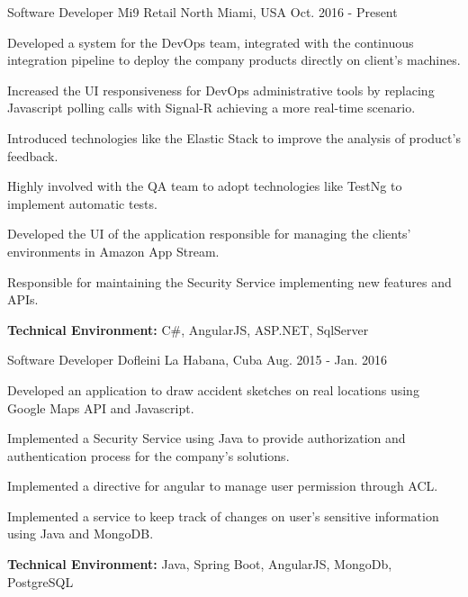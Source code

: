 
\begin{cventries}


\workexperienceentry
{Software Developer} %
{Mi9 Retail} %
{North Miami, USA} %
{Oct. 2016 - Present} %
{ %
\begin{cvitems}
    \item {Developed a system for the DevOps team, integrated with the continuous integration pipeline to deploy the company products directly on client's machines.}
    \item {Increased the UI responsiveness for DevOps administrative tools by replacing Javascript polling calls with Signal-R achieving a more real-time scenario.}
    \item {Introduced technologies like the Elastic Stack to improve the analysis of  product's feedback.}  
    \item {Highly involved with the QA team to adopt technologies like TestNg to implement automatic tests.}
    \item {Developed the UI of the application responsible for managing the clients' environments in Amazon App Stream.}
    \item {Responsible for maintaining the Security Service implementing new features and APIs.}
\end{cvitems}
}
{\textbf{Technical Environment:} C\#, AngularJS, ASP.NET, SqlServer}


\workexperienceentry
{Software Developer} %
{Dofleini} %
{La Habana, Cuba} %
{Aug. 2015 - Jan. 2016} %
{ %
\begin{cvitems}
	\item {Developed an application to draw accident sketches on real locations using Google Maps API and
		Javascript.}
	\item {Implemented a Security Service using Java to provide authorization and authentication
	process for the company's solutions.}
	\item {Implemented a directive for angular to manage user permission through ACL.}
	\item {Implemented a service to keep track of changes on user's sensitive information using Java and MongoDB.}
\end{cvitems}
}
{\textbf{Technical Environment:} Java, Spring Boot, AngularJS, MongoDb, PostgreSQL}



\end{cventries}

